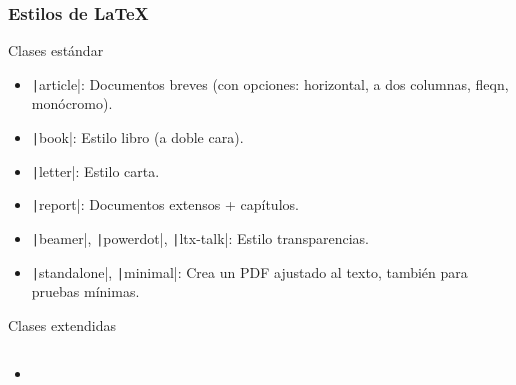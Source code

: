 \begin{frame}
	\frametitle{Estilos de \LaTeX}
	\begin{center}
	\end{center}

	\pause

	\begin{block}{Clases estándar}
		\begin{itemize}
			\item

			      \texttt|article|: Documentos
			      breves (con opciones: horizontal, a dos columnas, fleqn,
			      monócromo).

			\item

			      \texttt|book|: Estilo libro (a doble
			      cara).

			\item

			      \texttt|letter|: Estilo carta.


			\item

			      \texttt|report|: Documentos
			      extensos + capítulos.

			\item

			      \texttt|beamer|,
			      \texttt|powerdot|,
			      \texttt|ltx-talk|:
			      Estilo transparencias.

			\item

			      \texttt|standalone|,
			      \texttt|minimal|: Crea un PDF ajustado al
			      texto, también para pruebas mínimas.
		\end{itemize}
	\end{block}

	\pause

	\begin{block}{Clases extendidas}
		\vspace*{-.5\baselineskip}\setlength\belowdisplayshortskip{0pt}
		\begin{columns}
			\begin{column}{.52\paperwidth}
				\begin{itemize}
					\item


\end{itemize}
\end{column}
\end{columns}
\end{block}
\end{frame}
